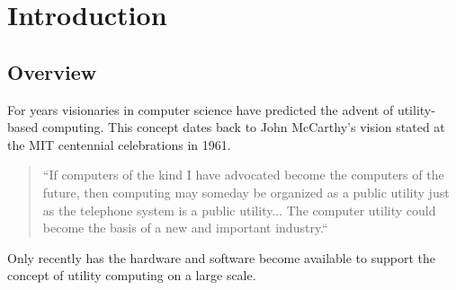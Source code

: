 
\chapter{Introduction}
\label{chap:intro}

\section{Overview}
\label{sec:overview}


For years visionaries in computer science have predicted the advent of utility-based computing.  This concept dates back to John McCarthy's vision stated at the MIT centennial celebrations in 1961.

\begin{quote}
``If computers of the kind I have advocated become the computers of the future, then computing may someday be organized as a public utility just as the telephone system is a public utility... The computer utility could become  the basis of a new and important industry.``
\end{quote}
 Only recently has the hardware and software become available to support the concept of utility computing on a large scale.

